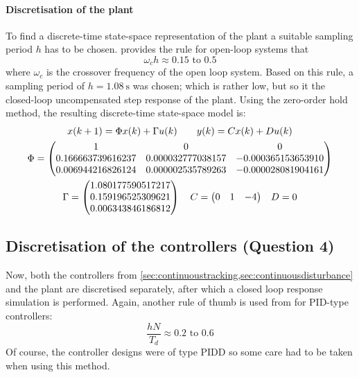 \paragraph{Discretisation of the plant}
To find a discrete-time state-space representation of the plant a suitable sampling period $h$ has to be chosen. \textcite[300]{astrom} provides the rule for open-loop systems that
$$ \omega_ch \approx 0.15 \text{ to } 0.5$$
where $\omega_c$ is the crossover frequency of the open loop system. Based on this rule, a sampling period of $h = \SI{1.08}{\second}$ was chosen; which is rather low, but so it the closed-loop uncompensated step response of the plant. Using the zero-order hold method, the resulting discrete-time state-space model is:
\begin{equation}
    \begin{gathered}
        x(k+1) = \Phi x(k) + \Gamma u(k) \qquad y(k) = Cx(k) + Du(k)\\
        \Phi = 
        \begin{pmatrix}   
            1        &           0       &            0\\
            0.166663739616237  &  0.000032777038157 &  -0.000365153653910\\
            0.006944216826124 & 0.000002535789263  & -0.000028081904161 \\
        \end{pmatrix}\\
        \Gamma = \begin{pmatrix}
               1.080177590517217 \\
                0.159196525309621 \\
                 0.006343846186812\\ 
        \end{pmatrix}\quad C = \mqty(0 & 1 & -4) \quad D = 0
    \end{gathered}
\end{equation}

\subsection{Discretisation of the controllers \textnormal{\phantom{xxx}(Question 4)}}
\label{sec:discretisecontrollers}
Now, both the controllers from \cref{sec:continuoustracking,sec:continuousdisturbance} and the plant are discretised separately, after which a closed loop response simulation is performed. Again, another rule of thumb is used from \textcite[317]{astrom} for PID-type controllers:
$$ \frac{hN}{T_d} \approx 0.2 \text{ to } 0.6$$
Of course, the controller designs were of type PIDD so some care had to be taken when using this method.

